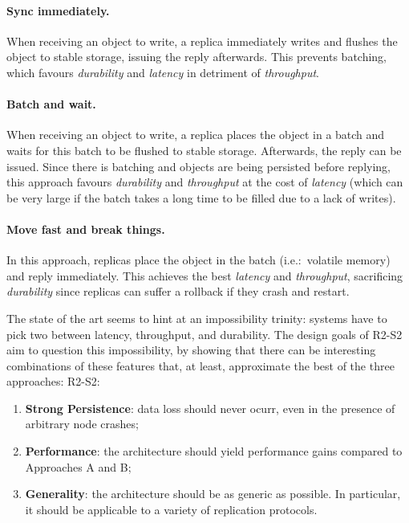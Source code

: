 \paragraph{Sync immediately.} When receiving an object to write, a
replica immediately writes and flushes the object to stable
storage, issuing the reply afterwards. This prevents batching,
which favours \emph{durability} and \emph{latency} in detriment
of \emph{throughput}.

\paragraph{Batch and wait.} When receiving an object to write, a
replica places the object in a batch and waits for this batch to
be flushed to stable storage. Afterwards, the reply can be
issued. Since there is batching and objects are being persisted
before replying, this approach favours \emph{durability} and
\emph{throughput} at the cost of \emph{latency} (which can be
very large if the batch takes a long time to be filled due to a
lack of writes).

\paragraph{Move fast and break things.} In this approach,
replicas place the object in the batch (i.e.:\ volatile memory)
and reply immediately. This achieves the best \emph{latency} and
\emph{throughput}, sacrificing \emph{durability} since replicas
can suffer a rollback if they crash and restart.

The state of the art seems to hint at
an impossibility trinity: systems have to pick two between latency,
throughput, and durability. The design goals of \ac{R2-S2} aim to question this
impossibility, by showing that there can be interesting
combinations of these features that, at least, approximate the
best of the three approaches:
\ac{R2-S2}:
\begin{enumerate}
    \item \textbf{Strong Persistence}: data loss should never
        ocurr, even in the presence of arbitrary node crashes;

    \item \textbf{Performance}: the architecture should yield
        performance gains compared to
        Approaches A and B\@;
    \item \textbf{Generality}: the architecture should be as
        generic as possible. In particular, it should be
        applicable to a variety of replication protocols.
\fi
\end{enumerate}


